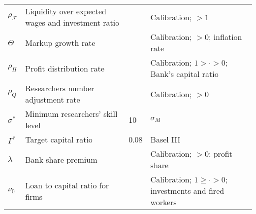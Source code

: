 \documentclass[a4paper, headings=standardclasses]{scrartcl}
\begin{document}
\begin{xltabular}{\linewidth}{lXlX}
    $\rho_\mathcal{F}$           & Liquidity over expected wages and investment ratio           &       & Calibration; $>1$                                                                                                                                                            \\
    $\Theta$                     & Markup growth rate                                           &       & Calibration; $>0$; inflation rate                                                                                                                                                            \\
    $\rho_\Pi$                      & Profit distribution rate                                     &  & Calibration; $1> \cdot >0$; Bank's capital ratio                                                                                                                                                            \\
    $\rho_Q$                     & Researchers number adjustment rate                           &       & Calibration; $>0$                                                                                                                                                            \\
    $\sigma^*$                   & Minimum researchers' skill level                             & 10  & $\sigma_M$                                                                                                                                                            \\
    $\Gamma^*$                   & Target capital ratio                                         & 0.08      & Basel III                                                                                                                                                            \\
    $\lambda$                    & Bank share premium                                           &       & Calibration; $>0$; profit share                                                                                                                                                            \\
    $\nu_0$                      & Loan to capital ratio for firms                              &       & Calibration; $1 \ge \cdot > 0$; investments and fired workers                                                                                                                                                           \\

\end{xltabular}
\end{document}
